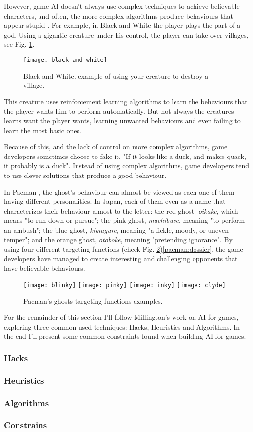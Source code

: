 However, game \ac{AI} doesn't always use complex techniques to achieve believable characters, and often, the more complex algorithms produce behaviours that appear stupid \cite{millington:AIgames}.
For example, in Black and White \cite{game:black&white} the player plays the part of a god.
Using a gigantic creature under his control, the player can take over villages, see Fig. \ref{fig:black-and-white}.
\begin{figure}
  \centering
    \texttt{[image: black-and-white]}
  \caption{Black and White, example of using your creature to destroy a village.}
  \label{fig:black-and-white}
\end{figure}
This creature uses reinforcement learning algorithms to learn the behaviours that the player wants him to perform automatically.
But not always the creatures learns want the player wants, learning unwanted behaviours and even failing to learn the most basic ones.

Because of this, and the lack of control on more complex algorithms, game developers sometimes choose to fake it.
"If it looks like a duck, and makes quack, it probably is a duck".
Instead of using complex algorithms, game developers tend to use clever solutions that produce a good behaviour.

In Pacman \cite{game:pacman}, the ghost's behaviour can almost be viewed as each one of them having different personalities.
In Japan, each of them even as a name that characterizes their behaviour almost to the letter: the red ghost, \textit{oikake}, which means "to run down or pursue"; the pink ghost, \textit{machibuse}, meaning "to perform an ambush"; the blue ghost, \textit{kimagure}, meaning "a fickle, moody, or uneven temper"; and the orange ghost, \textit{otoboke}, meaning "pretending ignorance".
By using four different targeting functions (check Fig. \ref{fig:ghosts-targeting})\ref{pacman:dossier}, the game developers have managed to create interesting and challenging opponents that have believable behaviours.

\begin{figure}
\texttt{[image: blinky]}
\texttt{[image: pinky]}
\texttt{[image: inky]}
\texttt{[image: clyde]}
  \caption{Pacman's ghosts targeting functions examples.}
  \label{fig:ghosts-targeting}
\end{figure}

For the remainder of this section I'll follow Millington's work \cite{millington:AIgames} on \ac{AI} for games, exploring three common used techniques: Hacks, Heuristics and Algorithms.
In the end I'll present some common constraints found when building \ac{AI} for games.

\subsubsection{Hacks}
\subsubsection{Heuristics}
\subsubsection{Algorithms}
\subsubsection{Constrains}
